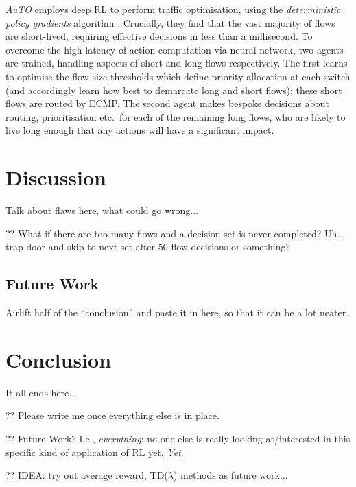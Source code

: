 \documentclass[conference, letterpaper, 10pt, times]{IEEEtran}
\begin{document}
\emph{AuTO} \cite{DBLP:conf/sigcomm/ChenL0L18} employs deep RL to perform traffic optimisation, using the \emph{deterministic policy gradients} algorithm \cite{DBLP:conf/icml/SilverLHDWR14}.
Crucially, they find that the vast majority of flows are short-lived, requiring effective decisions in less than a millisecond.
To overcome the high latency of action computation via neural network, two agents are trained, handling aspects of short and long flows respectively.
The first learns to optimise the flow size thresholds which define priority allocation at each switch (and accordingly learn how best to demarcate long and short flows); these short flows are routed by ECMP.
The second agent makes bespoke decisions about routing, prioritisation etc.\ for each of the remaining long flows, who are likely to live long enough that any actions will have a significant impact.


\section{Discussion}

Talk about flaws here, what could go wrong...

?? What if there are too many flows and a decision set is never completed? Uh... trap door and skip to next set after 50 flow decisions or something?

\subsection{Future Work}

Airlift half of the ``conclusion'' and paste it in here, so that it can be a lot neater.

\section{Conclusion}

It all ends here...

?? Please write me once everything else is in place.

?? Future Work? I.e., \emph{everything}: no one else is really looking at/interested in this specific kind of application of RL yet. \emph{Yet}.

?? IDEA: try out average reward, TD($\lambda$) methods as future work...
\end{document}
